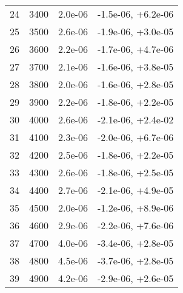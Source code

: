 \begin{table}
\begin{adjustbox}{width=1\textwidth/2}
\begin{tabular}{|c|c|c|c|}
\cline{1-4}
24 & 3400 & 2.0e-06 & -1.5e-06, +6.2e-06 \\
\cline{1-4}
25 & 3500 & 2.6e-06 & -1.9e-06, +3.0e-05 \\
\cline{1-4}
26 & 3600 & 2.2e-06 & -1.7e-06, +4.7e-06 \\
\cline{1-4}
27 & 3700 & 2.1e-06 & -1.6e-06, +3.8e-05 \\
\cline{1-4}
28 & 3800 & 2.0e-06 & -1.6e-06, +2.8e-05 \\
\cline{1-4}
29 & 3900 & 2.2e-06 & -1.8e-06, +2.2e-05 \\
\cline{1-4}
30 & 4000 & 2.6e-06 & -2.1e-06, +2.4e-02 \\
\cline{1-4}
31 & 4100 & 2.3e-06 & -2.0e-06, +6.7e-06 \\
\cline{1-4}
32 & 4200 & 2.5e-06 & -1.8e-06, +2.2e-05 \\
\cline{1-4}
33 & 4300 & 2.6e-06 & -1.8e-06, +2.5e-05 \\
\cline{1-4}
34 & 4400 & 2.7e-06 & -2.1e-06, +4.9e-05 \\
\cline{1-4}
35 & 4500 & 2.0e-06 & -1.2e-06, +8.9e-06 \\
\cline{1-4}
36 & 4600 & 2.9e-06 & -2.2e-06, +7.6e-06 \\
\cline{1-4}
37 & 4700 & 4.0e-06 & -3.4e-06, +2.8e-05 \\
\cline{1-4}
38 & 4800 & 4.5e-06 & -3.7e-06, +2.8e-05 \\
\cline{1-4}
39 & 4900 & 4.2e-06 & -2.9e-06, +2.6e-05 \\
\cline{1-4}
\end{tabular}
\end{adjustbox}
\end{table}

